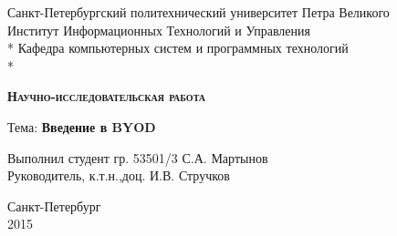 \begin{titlepage}
\thispagestyle{empty}

\begin{center}
Санкт-Петербургский политехнический университет Петра Великого\\
Институт Информационных Технологий и Управления\\*
Кафедра компьютерных систем и программных технологий\\*
\hrulefill
\end{center}

\vspace{15em}

\begin{center}
\textsc{\textbf{Научно-исследовательская работа}}
\vspace{1em}

\vspace{2em}

Тема: \textbf{Введение в BYOD}
\end{center}

\vspace{16em}

\begin{flushleft}
Выполнил студент гр. 53501/3 \hrulefill С.А. Мартынов \\
\vspace{1.5em}
Руководитель, к.т.н.,доц. \hrulefill И.В. Стручков\\
\end{flushleft}

\vspace{\fill}

\begin{center}
Санкт-Петербург \\
2015
\end{center}

\end{titlepage}
\setcounter{page}{2}